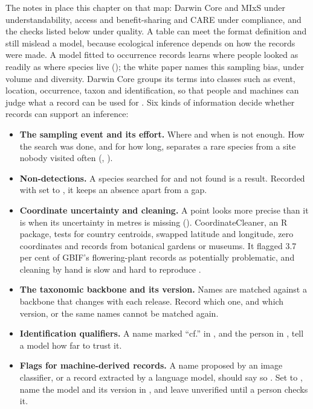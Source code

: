 The notes in  place this chapter on that map: Darwin
Core and MIxS under understandability, access and benefit-sharing and CARE
under compliance, and the checks listed below under quality. A table can meet
the format definition and still mislead a model, because ecological inference
depends on how the records were made. A model fitted to occurrence records
learns where people looked as readily as where species live
(); the white paper names this sampling bias, under
volume and diversity. Darwin Core groups its terms into classes such as
event, location, occurrence, taxon and identification, so that people and machines can judge
what a record can be used for \parencite{wieczorek2012darwincore}. Six kinds of
information decide whether records can support an inference:

\begin{itemize}
  \item \textbf{The sampling event and its effort.} Where and when is not
    enough. How the search was done, and for how long, separates a rare species
    from a site nobody visited often (,
    ).
  \item \textbf{Non-detections.} A species searched for and not found is a
    result. Recorded with  set to , it keeps
    an absence apart from a gap.
  \item \textbf{Coordinate uncertainty and cleaning.} A point looks more
    precise than it is when its uncertainty in metres is missing
    ().
    CoordinateCleaner, an R package, tests for country centroids, swapped
    latitude and longitude, zero coordinates and records from botanical gardens
    or museums. It flagged 3.7 per cent of GBIF's flowering-plant records as
    potentially problematic, and cleaning by hand is slow and hard to reproduce
    \parencite{zizka2019coordinatecleaner}.
  \item \textbf{The taxonomic backbone and its version.} Names are matched
    against a backbone that changes with each release. Record which one, and
    which version, or the same names cannot be matched again.
  \item \textbf{Identification qualifiers.} A name marked ``cf.'' in
    , and the person in , tell
    a model how far to trust it.
  \item \textbf{Flags for machine-derived records.} A name proposed by an image
    classifier, or a record extracted by a language model, should say so
    \parencite{legner2026aireadydata}. Set
     to , name the model and its
    version in , and leave
     unverified until a person checks it.
\end{itemize}

